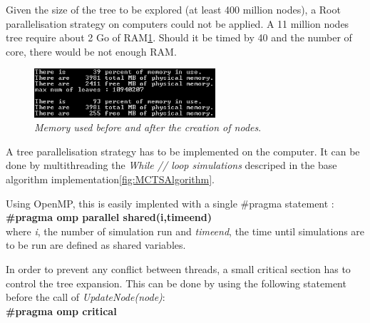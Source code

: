 Given the size of the tree to be explored (at least 400 million nodes), a Root parallelisation strategy on computers could not be applied. A 11 million nodes tree require about 2 Go of RAM\ref{fig:RAMTree}. Should it be timed by 40 and the number of core, there would be not enough RAM.
\begin{figure}[H]
\centerline{\includegraphics[width=0.6\textwidth]{Parallelisation/Computer/Img/RAM.png}}
\caption{\label{fig:RAMTree}\textit{Memory used before and after the creation of nodes}.}
\end{figure}

A tree parallelisation strategy has to be implemented on the computer. It can be done by multithreading the \textit{While // loop simulations} descriped in the base algorithm implementation\ref{fig:MCTSAlgorithm}.

Using OpenMP, this is easily implented with a single \#pragma statement :\\
\textbf{\#pragma omp parallel shared(i,timeend)}\\
where \textit{i}, the number of simulation run and \textit{timeend}, the time until simulations are to be run are defined as shared variables.

In order to prevent any conflict between threads, a small critical section has to control the tree expansion. This can be done by using the following statement before the call of \textit{UpdateNode(node)}:\\
\textbf{\#pragma omp critical}
